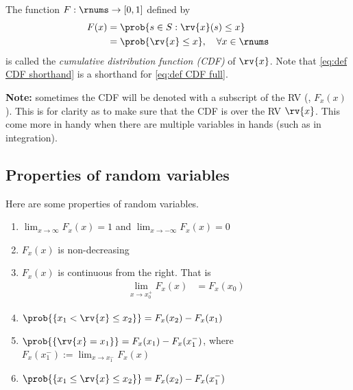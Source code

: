 \begin{mydefinition}
  The function $F : \rnums\to[0,1]$ defined by 
  \begin{align}
      F(x) 
      \label{eq:def CDF full}
      &= \prob{s\in S : \rv{x}(s)\leq x}\\
      \label{eq:def CDF shorthand}
      &= \prob{\rv{x}\leq x}, \quad \forall x\in\rnums
  \end{align}
  is called the \emph{cumulative distribution function (CDF)} of $\rv{x}$. Note that \eqref{eq:def CDF shorthand} is a shorthand for \eqref{eq:def CDF full}.

  \textbf{Note:} sometimes the CDF will be denoted with a subscript of the RV (\eg, $F_{x}(x)$). This is for clarity as to make sure that the CDF is over the RV $\rv{x}$. This come more in handy when there are multiple variables in hands (such as in integration).
\end{mydefinition}

\subsection{Properties of random variables}
Here are some properties of random variables.
\begin{enumerate}
    \item $\lim_{x\to\infty} F_{x}(x) =1$ and $\lim_{x\to-\infty} F_{x}(x)=0$
    \item $F_{x}(x)$ is non-decreasing 
    \item $F_{x}(x)$ is continuous from the right. That is
    \begin{align}
        \lim_{x\to x_{0}^{+}} F_{x}(x) &= F_{x}(x_{0})
    \end{align}
    \item $\prob{\left\{ x_{1}<\rv{x}\leq x_{2}\right\}}=F_{x}(x_{2})-F_{x}(x_{1})$
    \item $\prob{\left\{ \rv{x}=x_{1}\right\}}=F_{x}(x_{1})-F_{x}(x_{1}^{-})$, where $F_{x}(x_{1}^{-}):=\lim_{x\to x_{1}^{-}} F_{x}(x)$
    \item $\prob{\left\{ x_{1}\leq \rv{x} \leq x_{2}\right\}}=F_{x}(x_{2})-F_{x}(x_{1}^{-})$
\end{enumerate}

